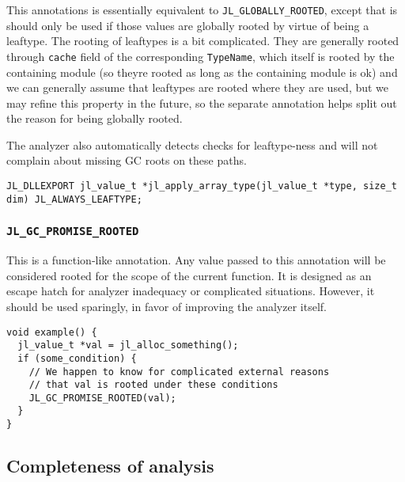 This annotations is essentially equivalent to \texttt{JL\_GLOBALLY\_ROOTED}, except that is should only be used if those values are globally rooted by virtue of being a leaftype. The rooting of leaftypes is a bit complicated. They are generally rooted through \texttt{cache} field of the corresponding \texttt{TypeName}, which itself is rooted by the containing module (so they{\textquotesingle}re rooted as long as the containing module is ok) and we can generally assume that leaftypes are rooted where they are used, but we may refine this property in the future, so the separate annotation helps split out the reason for being globally rooted.



The analyzer also automatically detects checks for leaftype-ness and will not complain about missing GC roots on these paths.




\begin{lstlisting}
JL_DLLEXPORT jl_value_t *jl_apply_array_type(jl_value_t *type, size_t dim) JL_ALWAYS_LEAFTYPE;
\end{lstlisting}



\hypertarget{15063650179417682020}{}


\subsubsection{\texttt{JL\_GC\_PROMISE\_ROOTED}}



This is a function-like annotation. Any value passed to this annotation will be considered rooted for the scope of the current function. It is designed as an escape hatch for analyzer inadequacy or complicated situations. However, it should be used sparingly, in favor of improving the analyzer itself.




\begin{lstlisting}
void example() {
  jl_value_t *val = jl_alloc_something();
  if (some_condition) {
    // We happen to know for complicated external reasons
    // that val is rooted under these conditions
    JL_GC_PROMISE_ROOTED(val);
  }
}
\end{lstlisting}



\hypertarget{18107261293830917313}{}


\subsection{Completeness of analysis}



